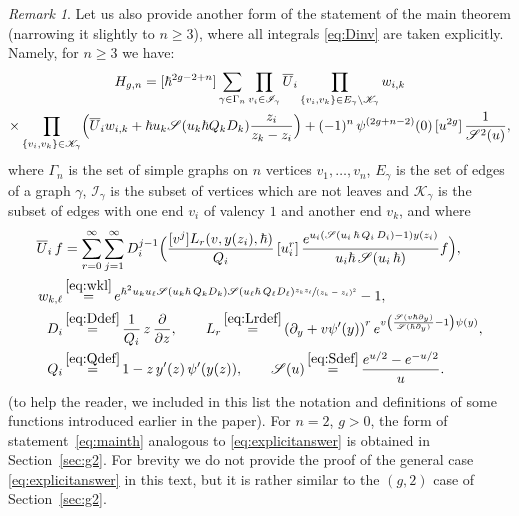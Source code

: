 \documentclass[11pt]{article}
\let\mathcal\mathscr
\theoremstyle{plain}
\theoremstyle{definition}
\theoremstyle{remark}
\newtheorem{remark}[theorem]{Remark}
\newcommand{\cS}{\mathcal{S}}
\newcommand{\Hc}{H}
\begin{document}
\begin{remark}\label{rem:generalExplicit}
Let us also provide
another
form of the statement of the main theorem (narrowing it slightly to $n\geq 3$),
where all integrals \eqref{eq:Dinv} are taken explicitly.
Namely, for $n\geq 3$ we have:
\begin{multline}
\label{eq:explicitanswer}
\Hc_{g,n}=
[\hbar^{2g-2+n}] \sum\limits_{\gamma\in\Gamma_n} \prod\limits_{v_i\in\mathcal{I}_\gamma} \overline{U}_i \prod\limits_{\{v_i,v_k\}\in E_\gamma\setminus\mathcal K_\gamma}w_{i,k}
\\
\times\prod_{\{v_i,v_k\}\in\mathcal{K}_\gamma}\Bigl(\overline{U}_i w_{i,k} + \hbar u_k \cS(u_k\hbar Q_kD_k)\frac{z_i}{z_k-z_i} \Bigr)
+ (-1)^{n}\,\psi^{(2g+n-2)}(0)\,[u^{2g}]\,\frac1{\cS^2(u)},
\end{multline}
where $\Gamma_n$ is the set of simple graphs on $n$ vertices $v_1,\ldots,v_n$, $E_\gamma$ is the set of edges of a graph $\gamma$, $\mathcal{I}_\gamma$ is the subset of vertices which are not leaves and $\mathcal{K}_\gamma$ is the subset of edges with one end $v_i$ of valency $1$ and another end $v_k$, and where
\begin{align*}
\overline U_i\, f &= \sum_{r=0}^\infty\sum_{j=1}^\infty D_i^{j-1} \Bigl(\frac{[v^j]L_r(v,y(z_i),\hbar)}{Q_i}
\,[u_i^r]\, \frac{e^{u_i(\cS(u_i\,\hbar\,Q_i\,D_i)-1)y(z_i)}}{u_i\hbar\,\cS(u_i\,\hbar)}f \Bigr),\\
w_{k,\ell}&\mathop{=}^{\eqref{eq:wkl}}e^{\hbar^2u_ku_\ell\cS(u_k\hbar\,Q_k D_k)\cS(u_\ell\hbar\,Q_\ell D_\ell)
\sfrac{z_k z_\ell}{(z_k-z_\ell)^2}}-1, \\
D_i &\mathop{=}^{\eqref{eq:Ddef}} \dfrac{1}{Q_i}\,z\, \dfrac{\partial}{\partial z},\qquad
L_r \mathop{=}^{\eqref{eq:Lrdef}} \left(\partial_y+v\psi'(y)\right)^r e^{v\left(\frac{\cS(v\hbar\partial_y)}{\cS(\hbar\partial_y)}-1\right)\psi(y)},\\
Q_i&\mathop{=}^{\eqref{eq:Qdef}} 1-z\,y'(z)\,\psi'(y(z)),\qquad
\mathcal{S}(u)\mathop{=}^{\eqref{eq:Sdef}}\dfrac{e^{u/2}-e^{-u/2}}{u}.
\end{align*}
(to help the reader, we included in this list the notation and definitions of some functions introduced earlier in the paper). For $n=2$, $g>0$, the form of statement~\eqref{eq:mainth} analogous to \eqref{eq:explicitanswer} is obtained in Section~\ref{sec:g2}. For brevity we do not provide the proof of the general case \eqref{eq:explicitanswer} in this text, but it is rather similar to the $(g,2)$ case of Section~\ref{sec:g2}.
\end{remark}
\end{document}
